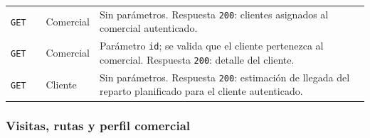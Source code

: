 {\begin{longtable}{A{0.10\textwidth}A{0.27\textwidth}A{0.15\textwidth}A{0.38\textwidth}}
\texttt{GET} &  & Comercial & Sin parámetros. Respuesta \texttt{200}: clientes asignados al comercial autenticado.\\
\texttt{GET} &  & Comercial & Parámetro \texttt{id}; se valida que el cliente pertenezca al comercial. Respuesta \texttt{200}: detalle del cliente.\\
\texttt{GET} &  & Cliente & Sin parámetros. Respuesta \texttt{200}: estimación de llegada del reparto planificado para el cliente autenticado.\\
\end{longtable}
}

\subsubsection{Visitas, rutas y perfil comercial}

